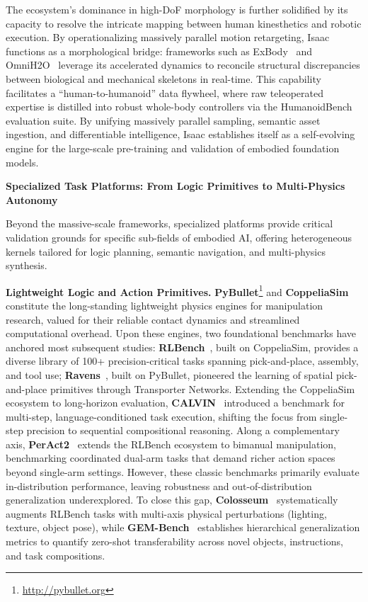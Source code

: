 \documentclass[acmsmall,screen,review,anonymous]{acmart}
\begin{document}
The ecosystem's dominance in high-DoF morphology is further solidified by its capacity to resolve the intricate mapping between human kinesthetics and robotic execution. 
By operationalizing massively parallel motion retargeting, Isaac functions as a morphological bridge: frameworks such as ExBody~\cite{cheng2024exbody} and OmniH2O~\cite{he2024omnih2o} leverage its accelerated dynamics to reconcile structural discrepancies between biological and mechanical skeletons in real-time. 
This capability facilitates a ``human-to-humanoid'' data flywheel, where raw teleoperated expertise is distilled into robust whole-body controllers via the HumanoidBench~\cite{sferrazza2024humanoidbenchsimulatedhumanoidbenchmark} evaluation suite. 
By unifying massively parallel sampling, semantic asset ingestion, and differentiable intelligence, Isaac establishes itself as a self-evolving engine for the large-scale pre-training and validation of embodied foundation models.

\textbf{Specialized Task Platforms: From Logic Primitives to Multi-Physics Autonomy}

Beyond the massive-scale frameworks, specialized platforms provide critical validation grounds for specific sub-fields of embodied AI, offering heterogeneous kernels tailored for logic planning, semantic navigation, and multi-physics synthesis.

\textbf{Lightweight Logic and Action Primitives.} \textbf{PyBullet}\footnote{\url{http://pybullet.org}} and \textbf{CoppeliaSim}~\cite{rohmer2013vrep} constitute the long-standing lightweight physics engines for manipulation research, valued for their reliable contact dynamics and streamlined computational overhead. Upon these engines, two foundational benchmarks have anchored most subsequent studies: \textbf{RLBench}~\cite{james2020rlbench}, built on CoppeliaSim, provides a diverse library of 100+ precision-critical tasks spanning pick-and-place, assembly, and tool use; \textbf{Ravens}~\cite{zhang2019raven}, built on PyBullet, pioneered the learning of spatial pick-and-place primitives through Transporter Networks. Extending the CoppeliaSim ecosystem to long-horizon evaluation, \textbf{CALVIN}~\cite{mees2022calvin} introduced a benchmark for multi-step, language-conditioned task execution, shifting the focus from single-step precision to sequential compositional reasoning. Along a complementary axis, \textbf{PerAct2}~\cite{shridhar2024peract2} extends the RLBench ecosystem to bimanual manipulation, benchmarking coordinated dual-arm tasks that demand richer action spaces beyond single-arm settings. However, these classic benchmarks primarily evaluate in-distribution performance, leaving robustness and out-of-distribution generalization underexplored. To close this gap, \textbf{Colosseum}~\cite{pumacay2024colosseum} systematically augments RLBench tasks with multi-axis physical perturbations (lighting, texture, object pose), while \textbf{GEM-Bench}~\cite{garcia2025gembench} establishes hierarchical generalization metrics to quantify zero-shot transferability across novel objects, instructions, and task compositions.
\end{document}
